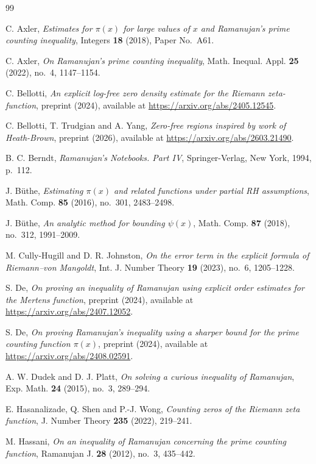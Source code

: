 \documentclass[11pt]{amsart}
\numberwithin{equation}{section}
\theoremstyle{definition}
\theoremstyle{remark}
\begin{document}
\begin{thebibliography}{99}

 C. Axler, \emph{Estimates for $\pi(x)$ for large values of $x$ and Ramanujan's prime counting inequality}, Integers \textbf{18} (2018), Paper No.~A61.

 C. Axler, \emph{On Ramanujan's prime counting inequality}, Math. Inequal. Appl. \textbf{25} (2022), no.~4, 1147--1154.

 C. Bellotti, \emph{An explicit log-free zero density estimate for the Riemann zeta-function}, preprint (2024), available at \url{https://arxiv.org/abs/2405.12545}.

 C. Bellotti, T. Trudgian and A. Yang, \emph{Zero-free regions inspired by work of Heath-Brown}, preprint (2026), available at \url{https://arxiv.org/abs/2603.21490}.

 B. C. Berndt, \emph{Ramanujan's Notebooks. Part IV}, Springer-Verlag, New York, 1994, p.~112.

 J. B\"uthe, \emph{Estimating $\pi(x)$ and related functions under partial RH assumptions}, Math. Comp. \textbf{85} (2016), no.~301, 2483--2498.

 J. B\"uthe, \emph{An analytic method for bounding $\psi(x)$}, Math. Comp. \textbf{87} (2018), no.~312, 1991--2009.

 M. Cully-Hugill and D. R. Johnston, \emph{On the error term in the explicit formula of Riemann--von Mangoldt}, Int. J. Number Theory \textbf{19} (2023), no.~6, 1205--1228.

 S. De, \emph{On proving an inequality of Ramanujan using explicit order estimates for the Mertens function}, preprint (2024), available at \url{https://arxiv.org/abs/2407.12052}.

 S. De, \emph{On proving Ramanujan's inequality using a sharper bound for the prime counting function $\pi(x)$}, preprint (2024), available at \url{https://arxiv.org/abs/2408.02591}.

 A. W. Dudek and D. J. Platt, \emph{On solving a curious inequality of Ramanujan}, Exp. Math. \textbf{24} (2015), no.~3, 289--294.

 E. Hasanalizade, Q. Shen and P.-J. Wong, \emph{Counting zeros of the Riemann zeta function}, J. Number Theory \textbf{235} (2022), 219--241.

 M. Hassani, \emph{On an inequality of Ramanujan concerning the prime counting function}, Ramanujan J. \textbf{28} (2012), no.~3, 435--442.


\end{thebibliography}
\end{document}
